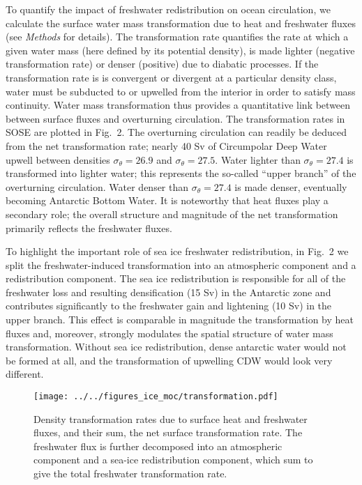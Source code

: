 \documentclass{naturemod}
\begin{document}
To quantify the impact of freshwater redistribution on ocean circulation, we calculate the surface water mass transformation due to heat and freshwater fluxes (see {\em Methods} for details). The transformation rate quantifies the rate at which a given water mass (here defined by its potential density), is made lighter (negative transformation rate) or denser (positive) due to diabatic processes. If the transformation rate is is convergent or divergent at a particular density class, water must be subducted to or upwelled from the interior in order to satisfy mass continuity. Water mass transformation thus provides a quantitative link between between surface fluxes and overturning circulation. The transformation rates in SOSE are plotted in Fig.~2. The overturning circulation can readily be deduced from the net transformation rate; nearly 40 Sv of Circumpolar Deep Water upwell between densities $\sigma_\theta =  26.9$ and $\sigma_\theta = 27.5$. Water lighter than $\sigma_\theta=27.4$ is transformed into lighter water; this represents the so-called ``upper branch'' of the overturning circulation. Water denser than $\sigma_\theta=27.4$ is made denser, eventually becoming Antarctic Bottom Water. It is noteworthy that heat fluxes play a secondary role; the overall structure and magnitude of the net transformation primarily reflects the freshwater fluxes.

To highlight the important role of sea ice freshwater redistribution, in Fig.~2 we split the freshwater-induced transformation into an atmospheric component and a redistribution component. The sea ice redistribution is responsible for all of the freshwater loss and resulting densification (15 Sv) in the Antarctic zone and contributes significantly to the freshwater gain and lightening (10 Sv) in the upper branch. This effect is comparable in magnitude the transformation by heat fluxes and, moreover, strongly modulates the spatial structure of water mass transformation. Without sea ice redistribution, dense antarctic water would not be formed at all, and the transformation of upwelling CDW would look very different.

\begin{figure}
\begin{center}
\texttt{[image: ../../figures\_ice\_moc/transformation.pdf]}
\caption{Density transformation rates due to surface heat and freshwater fluxes, and their sum, the net surface transformation rate. The freshwater flux is further decomposed into an atmospheric component and a sea-ice redistribution component, which sum to give the total freshwater transformation rate.}
\label{default}
\end{center}
\end{figure}
\end{document}
